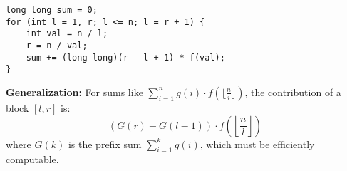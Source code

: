 \begin{verbatim}
long long sum = 0;
for (int l = 1, r; l <= n; l = r + 1) {
    int val = n / l;
    r = n / val;
    sum += (long long)(r - l + 1) * f(val);
}
\end{verbatim}

\textbf{Generalization:} For sums like $\sum_{i=1}^{n} g(i) \cdot f(\lfloor \frac{n}{i} \rfloor)$, the contribution of a block $[l, r]$ is:
$$ (G(r) - G(l-1)) \cdot f\left(\left\lfloor \frac{n}{l} \right\rfloor\right) $$
where $G(k)$ is the prefix sum $\sum_{i=1}^k g(i)$, which must be efficiently computable.